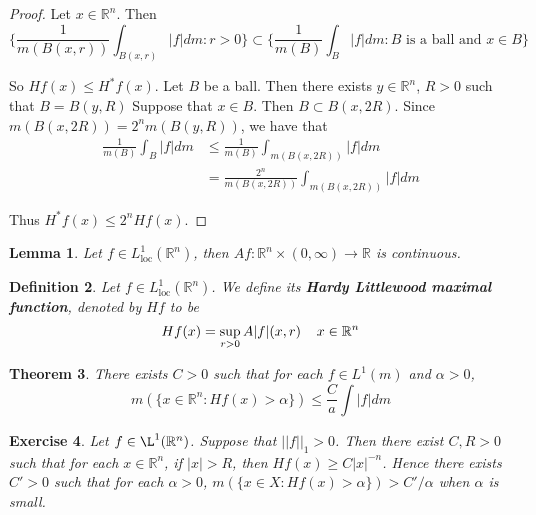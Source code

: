 \documentclass[12pt]{amsart}
\newtheorem{thm}{Theorem}[section]
\newtheorem{lem}[thm]{Lemma}
\newtheorem{defn}[thm]{Definition}
\newtheorem{ex}[thm]{Exercise}
\newcommand{\al}{\alpha}
\newcommand{\R}{\mathbb{R}}
\newcommand{\Ll}{L^1_{\text{loc}}(\R^n)}
\begin{document}
\begin{proof}
Let $x \in \R^n$. Then $$\bigg \{ \frac{1}{m(B(x,r))}\int_{B(x,r)}|f|dm: r >0\bigg \} \subset \bigg\{ \frac{1}{m(B)}\int_{B}|f|dm: B \text{ is a ball and } x \in B \bigg\} $$

So $Hf(x) \leq H^*f(x)$. Let $B$ be a ball. Then there exists $y \in \R^n$, $R>0$ such that $B = B(y,R)$ Suppose that $x \in B$. Then $B \subset B(x,2R)$. Since $m(B(x,2R)) = 2^n m(B(y,R))$, we have that 
\begin{align*}
\frac{1}{m(B)}\int_{B}|f|dm
& \leq \frac{1}{m(B)} \int_{m(B(x,2R))}|f|dm\\
&= \frac{2^n}{m(B(x,2R))} \int_{m(B(x,2R))}|f|dm
\end{align*}

Thus $H^*f(x) \leq 2^n Hf(x)$.
\end{proof}

\begin{lem}
Let $f \in \Ll$, then $Af:\R^n \times (0, \infty)\rightarrow \R$ is continuous.
\end{lem}

\begin{defn}
Let $f \in \Ll$. We define its \textbf{Hardy Littlewood maximal function}, denoted by $Hf$ to be $$Hf(x) = \sup_{r>0} A|f|(x,r) \hspace{4mm} x \in \R^n$$
\end{defn}

\begin{thm}
There exists $C >0$ such that for each $f \in L^1(m)$ and $\al > 0$, $$m(\{x \in \R^n: Hf(x) > \al\}) \leq \frac{C}{a} \int |f|dm$$
\end{thm}

\begin{ex}
Let $f \in \L^1(\R^n)$. Suppose that $||f||_1>0$. Then there exist $C,R>0$ such that for each $x \in \R^n$, if $|x| > R$, then $Hf(x) \geq C|x|^{-n}$. Hence there exists $C' > 0$ such that for each $\al >0$, $m(\{x \in X: Hf(x)>\alpha\}) > C'/\al$ when $\al$ is small. 
\end{ex}
\end{document}

